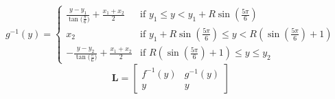 		\begin{equation}
		\label{eq:right}
			g^{-1}(y) = 
			\begin{cases} 
				\frac{y - y_1}{\tan{(\frac{\pi}{6}})} + \frac{x_1 + x_2}{2} & \text{if } y_1 \le y < y_1 + R\sin{(\frac{5\pi}{6})} \\
				x_2 & \text{if } y_1 + R\sin{(\frac{5\pi}{6})} \le y < R(\sin{(\frac{5\pi}{6})} + 1) \\
				-\frac{y - y_2}{\tan{(\frac{\pi}{6}})} + \frac{x_1 + x_2}{2} & \text{if } R(\sin{(\frac{5\pi}{6})} + 1) \le y \le y_2
			\end{cases}
		\end{equation}
		\begin{equation}
		\label{eq:line}
			\mathbf{L} =
			\begin{bmatrix}
				f^{-1}(y) & g^{-1}(y) \\
				y & y
			\end{bmatrix}
		\end{equation}
